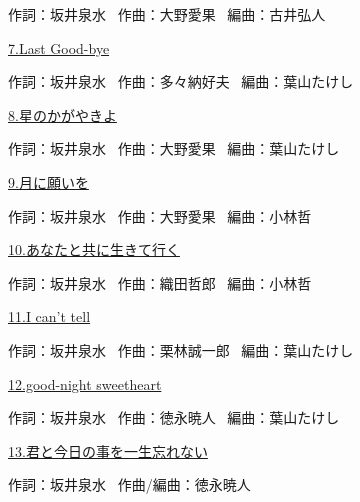 \tiny{作詞：坂井泉水 \ 作曲：大野愛果 \ 編曲：古井弘人}

\small{\hyperlink{11_6}{7.Last Good-bye}}

\tiny{作詞：坂井泉水 \ 作曲：多々納好夫 \ 編曲：葉山たけし}

\small{\hyperlink{11_7}{8.星のかがやきよ}}

\tiny{作詞：坂井泉水 \ 作曲：大野愛果 \ 編曲：葉山たけし}

\small{\hyperlink{11_8}{9.月に願いを}}

\tiny{作詞：坂井泉水 \ 作曲：大野愛果 \ 編曲：小林哲}

\small{\hyperlink{11_9}{10.あなたと共に生きて行く}}

\tiny{作詞：坂井泉水 \ 作曲：織田哲郎 \ 編曲：小林哲}

\small{\hyperlink{11_10}{11.I can't tell}}

\tiny{作詞：坂井泉水 \ 作曲：栗林誠一郎 \ 編曲：葉山たけし}

\small{\hyperlink{11_11}{12.good-night sweetheart}}

\tiny{作詞：坂井泉水 \ 作曲：徳永暁人 \ 編曲：葉山たけし}

\small{\hyperlink{11_12}{13.君と今日の事を一生忘れない}}

\tiny{作詞：坂井泉水 \ 作曲/編曲：徳永暁人}
\clearpage
